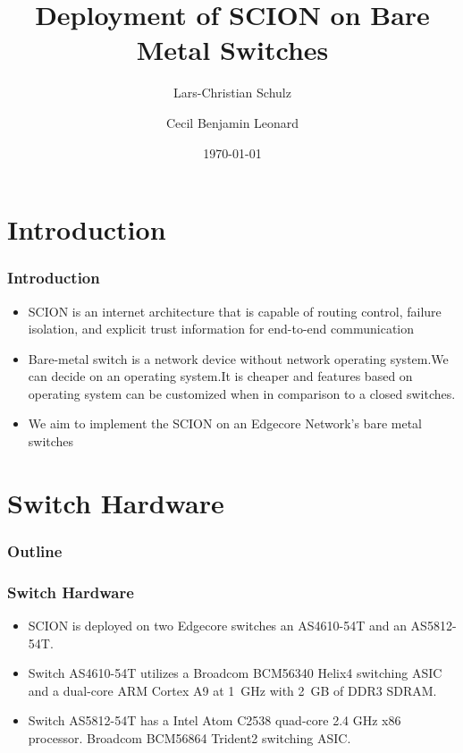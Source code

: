 \documentclass[12pt]{beamer}
\title{Deployment of SCION on Bare Metal Switches}
\author{Lars-Christian Schulz \and Cecil Benjamin Leonard}
\date{\today}
\begin{document}
\begin{frame}[plain]
\maketitle
\end{frame}

\section{Introduction}
\begin{frame}
\frametitle{Introduction}
\begin{itemize}
    \item SCION is an internet architecture that is capable of routing control, failure isolation, and explicit trust information for end-to-end communication
    \item Bare-metal switch is a network device without network operating system.We can decide on an operating system.It is cheaper and features based on operating system can be customized when in comparison to a closed switches.
    \item We aim to implement the SCION on an Edgecore Network's bare metal switches
\end{itemize}
\end{frame}


\section{Switch Hardware}
\begin{frame}
\frametitle{Outline}
\tableofcontents[currentsection]
\end{frame}

\begin{frame}
\frametitle{Switch Hardware}
\begin{itemize}
    \item SCION is deployed on two Edgecore switches an AS4610-54T and an AS5812-54T.
    \item Switch AS4610-54T utilizes a Broadcom BCM56340 Helix4 switching ASIC and a dual-core ARM Cortex A9 at 1~GHz with 2~GB of DDR3 SDRAM. 
    \item Switch AS5812-54T has a Intel Atom C2538 quad-core 2.4 GHz x86 processor. Broadcom BCM56864 Trident2 switching ASIC.
\end{itemize}
\end{frame}
\end{document}
